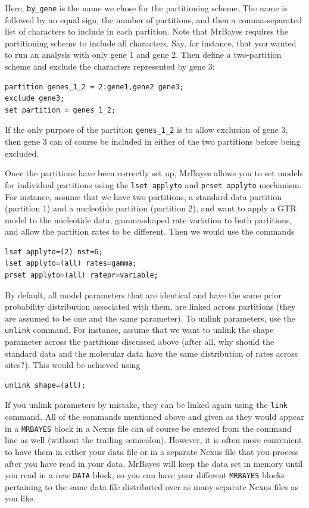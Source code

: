 \documentclass[12pt]{book}
\begin{document}
Here, \texttt{by\_gene} is the name we chose for the partitioning scheme. The name is followed by
an equal sign, the number of partitions, and then a comma-separated list of characters to include
in each partition. Note that MrBayes requires the partitioning scheme to include all characters.
Say, for instance, that you wanted to run an analysis with only gene 1 and gene 2. Then define a
two-partition scheme and exclude the characters represented by gene 3:

\begin{Verbatim}
partition genes_1_2 = 2:gene1,gene2 gene3;
exclude gene3;
set partition = genes_1_2;
\end{Verbatim}

If the only purpose of the partition \texttt{genes\_1\_2} is to allow exclusion of gene 3, then
gene 3 can of course be included in either of the two partitions before being excluded.

Once the partitions have been correctly set up, MrBayes allows you to set models for individual
partitions using the \texttt{lset applyto} and \texttt{prset applyto} mechanism. For instance,
assume that we have two partitions, a standard data partition (partition 1) and a nucleotide
partition (partition 2), and want to apply a GTR model to the nucleotide data, gamma-shaped rate
variation to both partitions, and allow the partition rates to be different. Then we would use the
commands

\begin{Verbatim}
lset applyto=(2) nst=6;
lset applyto=(all) rates=gamma;
prset applyto=(all) ratepr=variable;
\end{Verbatim}

By default, all model parameters that are identical and have the same prior probability
distribution associated with them, are linked across partitions (they are assumed to be one and the
same parameter). To unlink parameters, use the \texttt{unlink} command. For instance, assume that
we want to unlink the shape parameter across the partitions discussed above (after all, why should
the standard data and the molecular data have the same distribution of rates across sites?). This
would be achieved using

\begin{Verbatim}
unlink shape=(all);
\end{Verbatim}

If you unlink parameters by mistake, they can be linked again using the \texttt{link} command. All
of the commands mentioned above and given as they would appear in a \texttt{MRBAYES} block in a
Nexus file can of course be entered from the command line as well (without the trailing semicolon).
However, it is often more convenient to have them in either your data file or in a separate Nexus
file that you process after you have read in your data. MrBayes will keep the data set in memory
until you read in a new \texttt{DATA} block, so you can have your different \texttt{MRBAYES} blocks
pertaining to the same data file distributed over as many separate Nexus files as you like.
\end{document}
